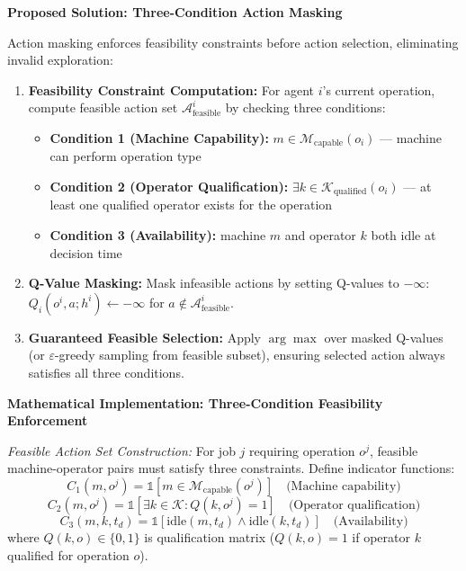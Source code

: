 \textbf{Proposed Solution: Three-Condition Action Masking}

Action masking enforces feasibility constraints before action selection, eliminating invalid exploration:

\begin{enumerate}
\item \textbf{Feasibility Constraint Computation:} For agent \( i \)'s current operation, compute feasible action set \( \mathcal{A}_{\text{feasible}}^i \) by checking three conditions:
\begin{itemize}
    \item \textbf{Condition 1 (Machine Capability):} \( m \in \mathcal{M}_{\text{capable}}(o_i) \) — machine can perform operation type
    \item \textbf{Condition 2 (Operator Qualification):} \( \exists k \in \mathcal{K}_{\text{qualified}}(o_i) \) — at least one qualified operator exists for the operation
    \item \textbf{Condition 3 (Availability):} machine \( m \) and operator \( k \) both idle at decision time
\end{itemize}

\item \textbf{Q-Value Masking:} Mask infeasible actions by setting Q-values to \( -\infty \): \( Q_i(o^i, a; h^i) \leftarrow -\infty \) for \( a \notin \mathcal{A}_{\text{feasible}}^i \).

\item \textbf{Guaranteed Feasible Selection:} Apply \( \arg\max \) over masked Q-values (or \( \varepsilon \)-greedy sampling from feasible subset), ensuring selected action always satisfies all three conditions.
\end{enumerate}

\textbf{Mathematical Implementation: Three-Condition Feasibility Enforcement}

\textit{Feasible Action Set Construction:} For job \( j \) requiring operation \( o^j \), feasible machine-operator pairs must satisfy three constraints. Define indicator functions:
\[
C_1(m, o^j) = \mathbb{1}[m \in \mathcal{M}_{\text{capable}}(o^j)] \quad \text{(Machine capability)}
\]
\[
C_2(m, o^j) = \mathbb{1}\left[\exists k \in \mathcal{K}: Q(k, o^j) = 1\right] \quad \text{(Operator qualification)}
\]
\[
C_3(m, k, t_d) = \mathbb{1}[\text{idle}(m, t_d) \land \text{idle}(k, t_d)] \quad \text{(Availability)}
\]
where \( Q(k, o) \in \{0, 1\} \) is qualification matrix (\( Q(k,o) = 1 \) if operator \( k \) qualified for operation \( o \)).

